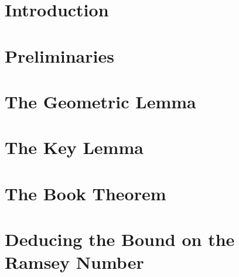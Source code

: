 \section{Introduction}


\section{Preliminaries}


\section{The Geometric Lemma}


\section{The Key Lemma}


\section{The Book Theorem}


\section{Deducing the Bound on the Ramsey Number}

